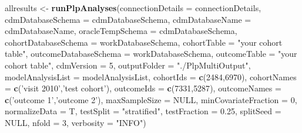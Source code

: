 \documentclass[
]{article}
\newenvironment{Shaded}{\begin{snugshade}}{\end{snugshade}}
\newcommand{\DataTypeTok}[1]{\textcolor[rgb]{0.13,0.29,0.53}{#1}}
\newcommand{\DecValTok}[1]{\textcolor[rgb]{0.00,0.00,0.81}{#1}}
\newcommand{\FloatTok}[1]{\textcolor[rgb]{0.00,0.00,0.81}{#1}}
\newcommand{\KeywordTok}[1]{\textcolor[rgb]{0.13,0.29,0.53}{\textbf{#1}}}
\newcommand{\NormalTok}[1]{#1}
\newcommand{\OtherTok}[1]{\textcolor[rgb]{0.56,0.35,0.01}{#1}}
\newcommand{\StringTok}[1]{\textcolor[rgb]{0.31,0.60,0.02}{#1}}
\begin{document}
\begin{Shaded}
\begin{Highlighting}[]
\NormalTok{allresults <-}\StringTok{ }\KeywordTok{runPlpAnalyses}\NormalTok{(}\DataTypeTok{connectionDetails =}\NormalTok{ connectionDetails,}
                           \DataTypeTok{cdmDatabaseSchema =}\NormalTok{ cdmDatabaseSchema,}
                           \DataTypeTok{cdmDatabaseName =}\NormalTok{ cdmDatabaseName,}
                           \DataTypeTok{oracleTempSchema =}\NormalTok{ cdmDatabaseSchema,}
                           \DataTypeTok{cohortDatabaseSchema =}\NormalTok{ workDatabaseSchema,}
                           \DataTypeTok{cohortTable =} \StringTok{"your cohort table"}\NormalTok{,}
                           \DataTypeTok{outcomeDatabaseSchema =}\NormalTok{ workDatabaseSchema,}
                           \DataTypeTok{outcomeTable =} \StringTok{"your cohort table"}\NormalTok{,}
                           \DataTypeTok{cdmVersion =} \DecValTok{5}\NormalTok{,}
                           \DataTypeTok{outputFolder =} \StringTok{"./PlpMultiOutput"}\NormalTok{,}
                           \DataTypeTok{modelAnalysisList =}\NormalTok{ modelAnalysisList,}
                           \DataTypeTok{cohortIds =} \KeywordTok{c}\NormalTok{(}\DecValTok{2484}\NormalTok{,}\DecValTok{6970}\NormalTok{),}
                           \DataTypeTok{cohortNames =} \KeywordTok{c}\NormalTok{(}\StringTok{'visit 2010'}\NormalTok{,}\StringTok{'test cohort'}\NormalTok{),}
                           \DataTypeTok{outcomeIds =} \KeywordTok{c}\NormalTok{(}\DecValTok{7331}\NormalTok{,}\DecValTok{5287}\NormalTok{),}
                           \DataTypeTok{outcomeNames =}  \KeywordTok{c}\NormalTok{(}\StringTok{'outcome 1'}\NormalTok{,}\StringTok{'outcome 2'}\NormalTok{),}
                           \DataTypeTok{maxSampleSize =} \OtherTok{NULL}\NormalTok{,}
                           \DataTypeTok{minCovariateFraction =} \DecValTok{0}\NormalTok{,}
                           \DataTypeTok{normalizeData =}\NormalTok{ T,}
                           \DataTypeTok{testSplit =} \StringTok{"stratified"}\NormalTok{,}
                           \DataTypeTok{testFraction =} \FloatTok{0.25}\NormalTok{,}
                           \DataTypeTok{splitSeed =} \OtherTok{NULL}\NormalTok{,}
                           \DataTypeTok{nfold =} \DecValTok{3}\NormalTok{,}
                           \DataTypeTok{verbosity =} \StringTok{"INFO"}\NormalTok{)}
\end{Highlighting}
\end{Shaded}
\end{document}
